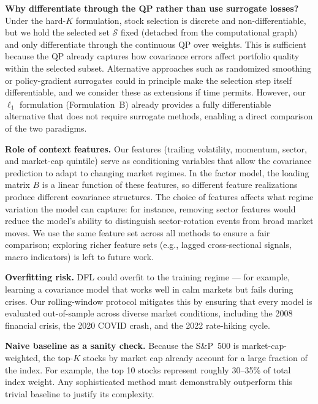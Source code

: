 \documentclass[11pt]{article}
\begin{document}
\textbf{Why differentiate through the QP rather than use surrogate losses?}\; Under the hard-$K$ formulation, stock selection is discrete and non-differentiable, but we hold the selected set $\mathcal{S}$ fixed (detached from the computational graph) and only differentiate through the continuous QP over weights.  This is sufficient because the QP already captures how covariance errors affect portfolio quality within the selected subset.  Alternative approaches such as randomized smoothing \citep{wilder2019melding} or policy-gradient surrogates could in principle make the selection step itself differentiable, and we consider these as extensions if time permits.  However, our $\ell_1$ formulation (Formulation~B) already provides a fully differentiable alternative that does not require surrogate methods, enabling a direct comparison of the two paradigms.

\textbf{Role of context features.}\; Our features (trailing volatility, momentum, sector, and market-cap quintile) serve as conditioning variables that allow the covariance prediction to adapt to changing market regimes.  In the factor model, the loading matrix $B$ is a linear function of these features, so different feature realizations produce different covariance structures.  The choice of features affects what regime variation the model can capture: for instance, removing sector features would reduce the model's ability to distinguish sector-rotation events from broad market moves.  We use the same feature set across all methods to ensure a fair comparison; exploring richer feature sets (e.g., lagged cross-sectional signals, macro indicators) is left to future work.

\textbf{Overfitting risk.}\; DFL could overfit to the training regime --- for example, learning a covariance model that works well in calm markets but fails during crises. Our rolling-window protocol mitigates this by ensuring that every model is evaluated out-of-sample across diverse market conditions, including the 2008 financial crisis, the 2020 COVID crash, and the 2022 rate-hiking cycle.

\textbf{Naive baseline as a sanity check.}\; Because the S\&P~500 is market-cap-weighted, the top-$K$ stocks by market cap already account for a large fraction of the index. For example, the top 10 stocks represent roughly 30--35\% of total index weight. Any sophisticated method must demonstrably outperform this trivial baseline to justify its complexity.

\end{document}

